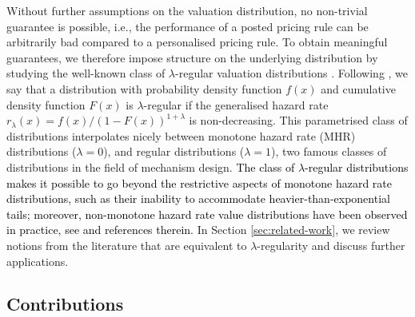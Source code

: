 \documentclass[11pt]{article}
\newcommand{\dn}[1]{\textcolor{red}{\small({\sf Daan: }{\sl #1})}}
\newcommand{\pk}[1]{\textcolor{ForestGreen}{\small({\sf Pieter: }{\sl #1})}}
\newcommand{\brown}[1]{\textcolor{black}{#1}}
\newcommand{\jvl}[1]{\textcolor{blue}{\small{\sf Johan: }{\sl #1}}}
\begin{document}
Without further assumptions on the valuation distribution, no non-trivial guarantee is possible, i.e., the performance of a posted pricing rule can be arbitrarily bad compared to a personalised pricing rule. 
To obtain meaningful guarantees, we therefore impose structure on the underlying distribution by studying the {well-known class of $\lambda$-regular valuation distributions \cite{mares2011near,ewerhart2013regular,cole2014sample,schweizer2019performance}}. Following \cite{schweizer2019performance}, we say that a distribution with probability density function $f(x)$ and cumulative density function $F(x)$ is $\lambda$-regular if the generalised hazard rate $r_{\lambda}(x) = f(x)/(1-F(x))^{1+\lambda}$ is non-decreasing.  This parametrised class of distributions interpolates nicely between monotone hazard rate (MHR) distributions ($\lambda = 0$), and regular distributions ($\lambda = 1$), two famous classes of distributions in the field of mechanism design. \brown{The class of $\lambda$-regular distributions makes it possible to go beyond the restrictive aspects of monotone hazard rate distributions, such as their inability to accommodate heavier-than-exponential tails; moreover, non-monotone hazard rate value distributions have been observed in practice, see \cite{ewerhart2013regular} and references therein.}
In Section \ref{sec:related-work}, we review notions from the literature that are equivalent to $\lambda$-regularity and discuss further applications.





\subsection{Contributions}
\end{document}
